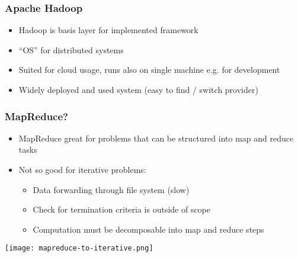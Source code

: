 
\begin{frame}
  \frametitle{Apache Hadoop}
  \begin{itemize}
    \item Hadoop is basis layer for implemented framework
    \item ``OS'' for distributed systems
    \item Suited for cloud usage, runs also on single machine e.g. for development
    \item Widely deployed and used system (easy to find / switch provider)
  \end{itemize}
\end{frame}

\begin{frame}
  \frametitle{MapReduce?}
  \begin{itemize}
    \item MapReduce great for problems that can be structured into map and reduce tasks
    \item Not so good for iterative problems:
    \begin{itemize}
      \item Data forwarding through file system (slow)
      \item Check for termination criteria is outside of scope
      \item Computation must be decomposable into map and reduce steps
    \end{itemize}
  \end{itemize}
  \begin{center}
    \texttt{[image: mapreduce-to-iterative.png]}
  \end{center}
\end{frame}


